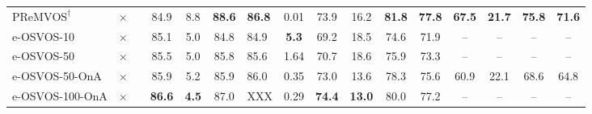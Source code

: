 \documentclass{article}
\begin{document}
\begin{table*}
{\begin{tabular}[t]{lcc cccHc cccc cccc}
$\textrm{PReMVOS}^{\dagger}$~\cite{luiten2018premvos}   &$\times$ & & 84.9 & 8.8  & {\bf 88.6} & {\bf 86.8} & 0.01 & 73.9 & 16.2 & \textbf{81.8} & {\bf 77.8} & \textbf{67.5} & \textbf{21.7} & \textbf{75.8} & \textbf{71.6}\\

        \cmidrule(r){1-3} \cmidrule(lr){4-8} \cmidrule(lr){9-12} \cmidrule(lr){13-16}

        e-OSVOS-10                       & $\times$ & & 85.1 & 5.0  & 84.8 & 84.9 & \textbf{5.3} & 69.2  & 18.5 & 74.6 & 71.9 &--&--&--&--\\
        e-OSVOS-50                       & $\times$ & & 85.5 & 5.0  & 85.8 & 85.6 & 1.64 & 70.7  & 18.6 & 75.9 & 73.3  &--&--&--&--\\

        \cmidrule(r){1-3} \cmidrule(lr){4-8} \cmidrule(lr){9-12} \cmidrule(lr){13-16}

        e-OSVOS-50-OnA                   & $\times$ & & 85.9 & 5.2  & 85.9 & 86.0 & 0.35 & 73.0  & 13.6 & 78.3 & 75.6 & 60.9 & 22.1 & 68.6 & 64.8\\
        e-OSVOS-100-OnA                   & $\times$ & & \textbf{86.6} & \textbf{4.5}  & 87.0 & XXX & 0.29 & \textbf{74.4}  & \textbf{13.0} & 80.0 & 77.2  &--&--&--&--\\
        \bottomrule
    \end{tabular}
    }
\label{tab:comparison_all}
\end{table*}     \begin{table*}
    \centering
\caption{
        VOS performance evaluated on the \textbf{YouTube-VOS} validation set.
This benchmark additionally evaluates the performance on completely unseen object classes.
Results of other methods are copied from~\cite{STM_19}.
}
\end{table*}
\end{document}
